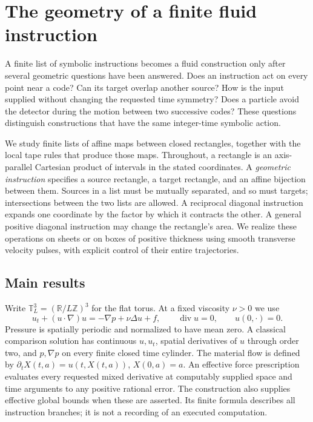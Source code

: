 \section{The geometry of a finite fluid instruction}
\label{sv:introduction}

A finite list of symbolic instructions becomes a fluid construction only
after several geometric questions have been answered.  Does an instruction
act on every point near a code?  Can its target overlap another source?
How is the input supplied without changing the requested time symmetry?
Does a particle avoid the detector during the motion between two successive
codes?  These questions distinguish constructions that have the same
integer-time symbolic action.

We study finite lists of affine maps between closed rectangles, together
with the local tape rules that produce those maps. Throughout, a rectangle
is an axis-parallel Cartesian product of intervals in the stated coordinates.
A \emph{geometric
instruction} specifies a source rectangle, a target rectangle, and an
affine bijection between them.  Sources in a list must be mutually
separated, and so must targets; intersections between the two lists are
allowed.  A reciprocal diagonal instruction expands one coordinate by
the factor by which it contracts the other.  A general positive diagonal
instruction may change the rectangle's area.  We realize these operations
on sheets or on boxes of positive thickness using smooth transverse
velocity pulses, with explicit control of their entire trajectories.

\subsection{Main results}
Write $\mathbb T_L^3=(\mathbb R/L\mathbb Z)^3$ for the flat torus.
At a fixed viscosity $\nu>0$ we use
\begin{equation}\label{sv:NS}
 u_t+(u\cdot\nabla)u=-\nabla p+\nu\Delta u+f,
 \qquad \operatorname{div}u=0,\qquad u(0,\cdot)=0.
\end{equation}
Pressure is spatially periodic and normalized to have mean zero.
A classical comparison solution has continuous $u,u_t$, spatial
derivatives of $u$ through order two, and $p,\nabla p$ on every finite
closed time cylinder.  The material flow is defined by
$\partial_tX(t,a)=u(t,X(t,a))$, $X(0,a)=a$.
An effective force prescription evaluates every requested mixed derivative
at computably supplied space and time arguments to any positive rational
error.  The construction also supplies effective global bounds when these
are asserted.  Its finite formula describes all instruction branches;
it is not a recording of an executed computation.

